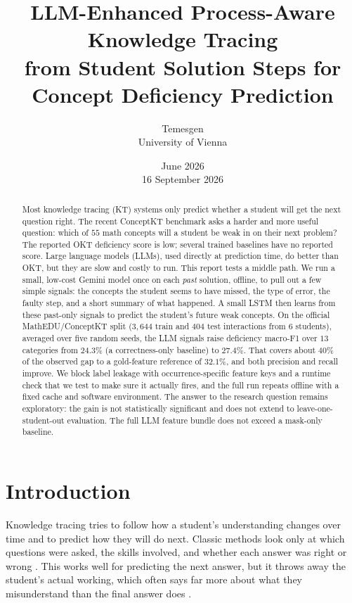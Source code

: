\documentclass[11pt]{article}
\title{\bfseries LLM-Enhanced Process-Aware Knowledge Tracing\\
from Student Solution Steps for Concept Deficiency Prediction}
\author{Temesgen\\[2pt]
\normalsize University of Vienna}
\date{June 2026\\\small 16 September 2026}
\begin{document}
\maketitle

\begin{abstract}
\noindent
Most knowledge tracing (KT) systems only predict whether a student will get the
next question right. The recent ConceptKT benchmark asks a harder and more useful
question: which of $55$ math concepts will a student be weak in on their next
problem? The reported OKT deficiency score is low; several trained baselines have
no reported score. Large language models (LLMs), used directly at prediction time,
do better than OKT, but they are slow and costly to run. This report tests a middle path. We run a small, low-cost Gemini model once on each
\emph{past} solution, offline, to pull out a few simple signals: the concepts the
student seems to have missed, the type of error, the faulty step, and a short
summary of what happened. A small LSTM then learns from these past-only signals to
predict the student's future weak concepts. On the official MathEDU/ConceptKT split
($3{,}644$ train and $404$ test interactions from $6$ students), averaged over five
random seeds, the LLM signals raise deficiency macro-F1 over $13$ categories from
$24.3\%$ (a correctness-only baseline) to $27.4\%$. That covers about $40\%$ of the observed
gap to a gold-feature reference of $32.1\%$, and both precision and recall improve. We
block label leakage with occurrence-specific feature keys and a runtime check that we test to make sure it actually fires,
and the full run repeats offline with a fixed cache and software environment. The answer to the
research question remains exploratory: the gain is not statistically significant and does not extend to leave-one-student-out evaluation. The full LLM feature bundle does not exceed a mask-only baseline.
\end{abstract}

\section{Introduction}
Knowledge tracing tries to follow how a student's understanding changes over time and
to predict how they will do next. Classic methods look only at which questions were
asked, the skills involved, and whether each answer was right or wrong
\cite{piech2015dkt}. This works well for predicting the next answer, but it throws
away the student's actual working, which often says far more about what they
misunderstand than the final answer does \cite{huang2024remembering}.
\end{document}
